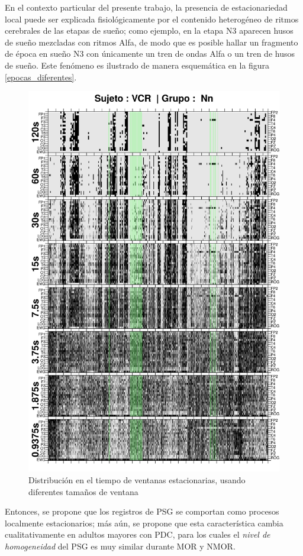 En el contexto particular del presente trabajo, la presencia de estacionariedad local puede ser
explicada fisiológicamente por el contenido heterogéneo de ritmos cerebrales de las etapas de 
sueño; como ejemplo, en la etapa N3 aparecen husos de sueño mezcladas con ritmos Alfa, de modo
que es posible hallar un fragmento de época en sueño N3 con únicamente un tren de ondas Alfa
o un tren de husos de sueño.
Este fenómeno es ilustrado de manera esquemática en la figura \ref{epocas_diferentes}.

\begin{figure}
\centering
\includegraphics[width=0.7\linewidth]
{./img_ejemplos/VCNNS1_comp_est_.png}
\caption{Distribución en el tiempo de ventanas estacionarias, usando diferentes tamaños
de ventana}
\label{comp_VCR}
\end{figure}

Entonces, se propone que los registros de PSG se comportan como procesos localmente estacionarios; 
más aún, se propone que esta característica cambia cualitativamente en adultos mayores con PDC,
para los cuales el \textit{nivel de homogeneidad} del PSG es muy similar durante MOR y NMOR.


